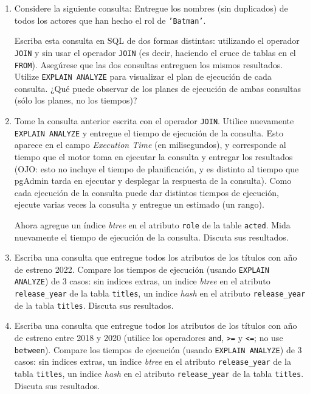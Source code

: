 \documentclass[11pt,a4paper]{article}
\begin{document}
\begin{enumerate}

\item Considere la siguiente consulta: Entregue los nombres (sin duplicados) de todos los actores que han hecho el rol de {\tt 'Batman'}.
 
Escriba esta consulta en SQL de dos formas distintas: utilizando el operador {\tt JOIN} y sin usar el operador {\tt JOIN} (es decir, haciendo el cruce de tablas en el {\tt FROM}). Asegúrese que las dos consultas entreguen los mismos resultados. Utilize {\tt EXPLAIN ANALYZE} para visualizar el plan de ejecución de cada consulta. ¿Qué puede observar de los planes de ejecución de ambas consultas (sólo los planes, no los tiempos)? 

\item Tome la consulta anterior escrita con el operador {\tt JOIN}. Utilice nuevamente {\tt EXPLAIN ANALYZE} y entregue el tiempo de ejecución de la consulta. Esto aparece en el campo \emph{Execution Time} (en milisegundos), y corresponde al tiempo que el motor toma en ejecutar la consulta y entregar los resultados (OJO: esto no incluye el tiempo de planificación, y es distinto al tiempo que pgAdmin tarda en ejecutar y desplegar la respuesta de la consulta). Como cada ejecución de la consulta puede dar distintos tiempos de ejecución, ejecute varias veces la consulta y entregue un estimado (un rango). 

Ahora agregue un índice \emph{btree} en el atributo {\tt role} de la table {\tt acted}. Mida nuevamente el tiempo de ejecución de la consulta. Discuta sus resultados. 

\item Escriba una consulta que entregue todos los atributos de los títulos con año de estreno 2022. Compare los tiempos de ejecución (usando {\tt EXPLAIN ANALYZE}) de 3 casos: sin indices extras, un indice \emph{btree} en el atributo {\tt release\_year} de la tabla {\tt titles}, un indice \emph{hash} en el atributo {\tt release\_year} de la tabla {\tt titles}. Discuta sus resultados. 

\item Escriba una consulta que entregue todos los atributos de los títulos con año de estreno entre 2018 y 2020 (utilice los operadores {\tt and}, {\tt >=} y {\tt <=}; no use {\tt between}). Compare los tiempos de ejecución (usando {\tt EXPLAIN ANALYZE}) de 3 casos: sin indices extras, un indice \emph{btree} en el atributo {\tt release\_year} de la tabla {\tt titles}, un indice \emph{hash} en el atributo {\tt release\_year} de la tabla {\tt titles}. Discuta sus resultados. 

\end{enumerate}
\end{document}
